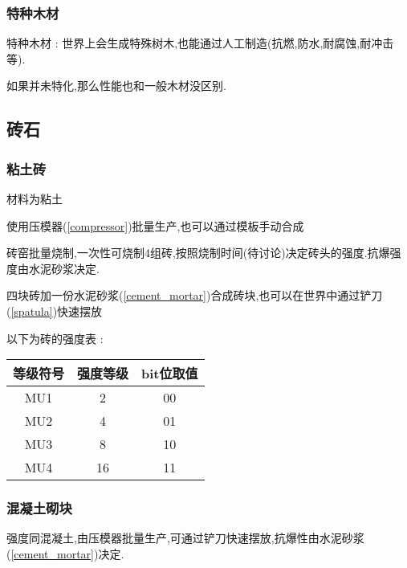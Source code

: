{{      \subsubsection{特种木材}{
          特种木材 : 世界上会生成特殊树木,也能通过人工制造(抗燃,防水,耐腐蚀,耐冲击等).

          如果并未特化,那么性能也和一般木材没区别.
      }
  }

  \subsection{砖石}{

      \subsubsection{粘土砖}{
          材料为粘土

          使用压模器({\ref{compressor}})批量生产,也可以通过模板手动合成

          砖窑批量烧制,一次性可烧制4组砖,按照烧制时间(待讨论)决定砖头的强度.抗爆强度由水泥砂浆决定.

          四块砖加一份水泥砂浆({\ref{cement_mortar}})合成砖块,也可以在世界中通过铲刀({\ref{spatula}})快速摆放

          以下为砖的强度表 :

          \begin{center}
              \begin{tabular}{|c|c|c|}
                  \hline
                  等级符号 & 强度等级 & bit位取值 \\
                  \hline
                  MU1      & 2        & 00        \\
                  \hline
                  MU2      & 4        & 01        \\
                  \hline
                  MU3      & 8        & 10        \\
                  \hline
                  MU4      & 16       & 11        \\
                  \hline
              \end{tabular}
          \end{center}
      }

      \subsubsection{混凝土砌块}{
          强度同混凝土,由压模器批量生产,可通过铲刀快速摆放,抗爆性由水泥砂浆({\ref{cement_mortar}})决定.
      }

}}
